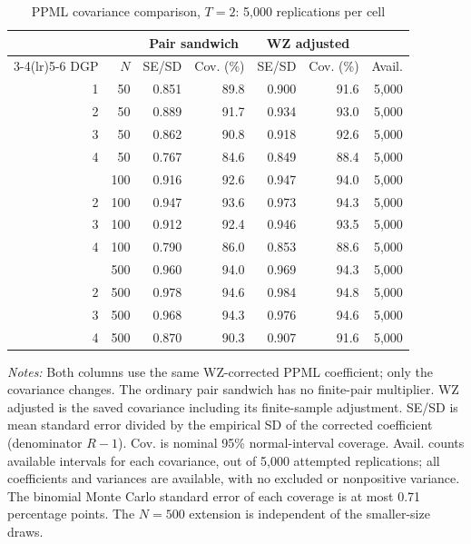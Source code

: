 \begin{table}[p]
\centering
\begin{singlespace}
\normalsize
\caption{PPML covariance comparison, $T=2$: 5,000 replications per cell}
\label{tab:fe-wz-covariance-comparison}
\setlength{\tabcolsep}{4pt}
\begin{tabular}{@{}rrrrrrr@{}}
\toprule
 & & \multicolumn{2}{c}{Pair sandwich} & \multicolumn{2}{c}{WZ adjusted} & \\
\cmidrule(lr){3-4}\cmidrule(lr){5-6}
DGP & $N$ & SE/SD & Cov. (\%) & SE/SD & Cov. (\%) & Avail.\\
\midrule
1 & 50 & 0.851 & 89.8 & 0.900 & 91.6 & 5,000 \\
2 & 50 & 0.889 & 91.7 & 0.934 & 93.0 & 5,000 \\
3 & 50 & 0.862 & 90.8 & 0.918 & 92.6 & 5,000 \\
4 & 50 & 0.767 & 84.6 & 0.849 & 88.4 & 5,000 \\
\addlinespace[3pt]
1 & 100 & 0.916 & 92.6 & 0.947 & 94.0 & 5,000 \\
2 & 100 & 0.947 & 93.6 & 0.973 & 94.3 & 5,000 \\
3 & 100 & 0.912 & 92.4 & 0.946 & 93.5 & 5,000 \\
4 & 100 & 0.790 & 86.0 & 0.853 & 88.6 & 5,000 \\
\addlinespace[3pt]
1 & 500 & 0.960 & 94.0 & 0.969 & 94.3 & 5,000 \\
2 & 500 & 0.978 & 94.6 & 0.984 & 94.8 & 5,000 \\
3 & 500 & 0.968 & 94.3 & 0.976 & 94.6 & 5,000 \\
4 & 500 & 0.870 & 90.3 & 0.907 & 91.6 & 5,000 \\
\bottomrule
\end{tabular}
\par\smallskip
\begin{minipage}{\linewidth}
\footnotesize\textit{Notes:} Both columns use the same WZ-corrected PPML coefficient; only the covariance changes. The ordinary pair sandwich has no finite-pair multiplier. WZ adjusted is the saved \citet{weidner2021bias} covariance including its finite-sample adjustment. SE/SD is mean standard error divided by the empirical SD of the corrected coefficient (denominator $R-1$). Cov. is nominal 95\% normal-interval coverage. Avail. counts available intervals for each covariance, out of 5,000 attempted replications; all coefficients and variances are available, with no excluded or nonpositive variance. The binomial Monte Carlo standard error of each coverage is at most 0.71 percentage points. The $N=500$ extension is independent of the smaller-size draws.
\end{minipage}
\end{singlespace}
\end{table}
